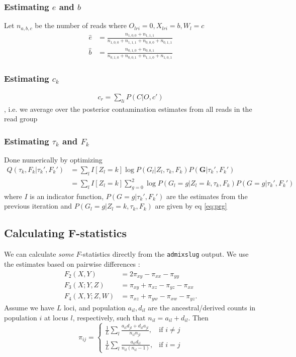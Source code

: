 \documentclass[10pt,a4paper]{article}
\begin{document}
\subsubsection*{Estimating $e$ and $b$}
Let $n_{a,b,c}$ be the number of reads where $O_{lri}=0, X_{lri}=b, W_l=c$
\begin{align*}
\hat{e} & = \frac{n_{1,0,0} + n_{1,1,1}}{n_{1,0,0} + n_{1,1,1} + n_{0,0,0} +n_{0, 1, 1}}\\
\hat{b} & = \frac{n_{0,1,0} + n_{0, 0,1}}{n_{0, 1, 0} + n_{0, 0, 1} + n_{1, 1, 0} +n_{1, 0, 1}}
\end{align*}
\subsubsection*{Estimating $c_k$}
\begin{align*}
c_r =  \sum_{li} P(C| O, c')
\end{align*},
i.e. we average over the posterior contamination estimates from all reads in the read group
\subsubsection*{Estimating $\tau_k$ and $F_k$}
Done numerically by optimizing
\begin{align*}
Q(\tau_k, F_k | \tau_k', F_k') 
&= \sum_{l} I[Z_l=k] \log P( G_l | Z_l, \tau_k, F_k) P(\mathbf{G} | \tau_k', F_k') \\
&= \sum_{l} I[Z_l=k]\sum_{g=0}^2 \log P( G_l=g | Z_l=k, \tau_k, F_k)P(G=g | \tau_k', F_k')
\end{align*}
where $I$ is an indicator function, $P(G=g | \tau_k', F_k')$ are the estimates from the previous iteration and $ P( G_l=g | Z_l=k, \tau_k, F_k)$ are given by eq \ref{eq:prg}

\subsection*{Calculating F-statistics}
We can calculate \emph{some} $F$-statistics directly from the \texttt{admixslug} output. We use the estimates based on pairwise differences \citep{peter2016}:
\begin{align}
F_2(X, Y) &= 2\pi_{xy} -\pi_{xx} - \pi_{yy}\\
F_3(X; Y, Z) &= \pi_{xy} +\pi_{xz} - \pi_{yz} - \pi_{xx}\\
F_4(X, Y; Z, W) &= \pi_{xz} +\pi_{yw} - \pi_{xw} - \pi_{yz}.
\end{align}
Assume we have $L$ loci, and population $a_{il}, d_{il}$ are the ancestral/derived counts in population $i$ at locus $l$, respectively, such that $n_{il} = a_{il} + d_{il}$. Then
\begin{equation}
\pi_{ij} = \begin{cases}
\frac{1}{L}\sum_l \frac{a_{il}d_{jl} + d_{il}a_{jl}} {n_{il}n_{jl}} ,& \text{if } i \neq j\\
\frac{1}{L}\sum_l \frac{a_{il}d_{il}}{n_{il}(n_{il} -1)},              & \text{if }i =j
\end{cases}
\end{equation}
\end{document}
